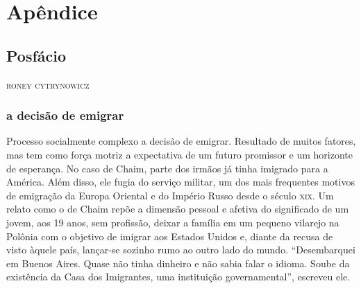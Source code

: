 \part{Apêndice}

\chapter*{Posfácio\smallskip{}}

\begin{flushright}
\textsc{roney cytrynowicz}
\end{flushright}

\noindent{}


\section{a decisão de emigrar}

Processo socialmente complexo a decisão de emigrar. Resultado de muitos fatores, mas tem 
como força motriz a expectativa de um futuro promissor e um horizonte de
esperança. No caso de Chaim, parte dos irmãos já tinha imigrado para a
América. Além disso, ele fugia do serviço militar, um dos mais frequentes
motivos de emigração da Europa Oriental e do Império Russo desde o
século \textsc{xix}. Um relato como o de Chaim repõe a dimensão pessoal e afetiva do significado de um jovem, aos 19 anos, sem profissão, deixar a família em
um pequeno vilarejo na Polônia com o objetivo de imigrar aos Estados
Unidos e, diante da recusa de visto àquele país, lançar-se sozinho rumo
ao outro lado do mundo. ``Desembarquei em Buenos Aires. Quase não tinha dinheiro e não sabia falar o idioma. Soube da existência da Casa dos Imigrantes, uma instituição governamental'', escreveu ele.

